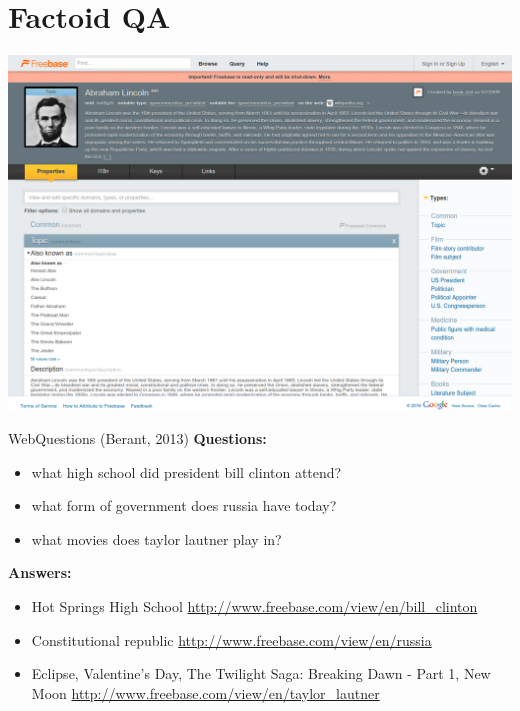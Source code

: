 \documentclass{beamer}
\begin{document}
\section{Factoid QA}

  

\begin{frame}
  \begin{center}
    \includegraphics[width=\textwidth]{freebaseabe}
  \end{center}
\end{frame}

\begin{frame}[fragile]{WebQuestions (Berant, 2013)} 
\textbf{Questions:}
\begin{itemize}
\item what high school did president bill clinton attend?
\item what form of government does russia have today?
\item what movies does taylor lautner play in?
\end{itemize}
\textbf{Answers:}
\begin{itemize}
\item Hot Springs High School \url{http://www.freebase.com/view/en/bill_clinton}
\item Constitutional republic \url{http://www.freebase.com/view/en/russia}
\item  Eclipse, Valentine's Day, The Twilight Saga: Breaking Dawn -   Part 1, New Moon \url{http://www.freebase.com/view/en/taylor_lautner}
\end{itemize}
\end{frame}
\end{document}

